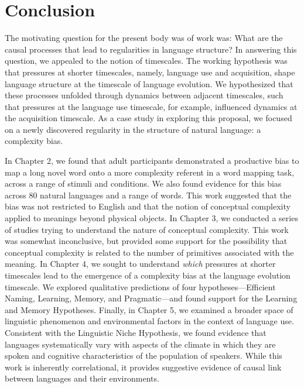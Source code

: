 
\chapter{Conclusion}
\label{chapter:conclusion}
The motivating question for the present body was of work was: What are the causal processes that lead to regularities in language structure?   In answering this question, we appealed to the notion of timescales. The working hypothesis was that pressures at shorter timescales, namely, language use and acquisition, shape language structure at the timescale of language evolution. We hypothesized that these processes unfolded through dynamics between adjacent timescales, such that pressures at the language use timescale, for example, influenced dynamics at the acquisition timescale.  As a case study in exploring this proposal, we focused on a newly discovered regularity in the structure of natural language: a complexity bias.

In Chapter 2, we found that adult participants demonstrated a productive bias to map a long novel word onto a more complexity referent in a word mapping task, across a range of stimuli and conditions. We  also found evidence for this bias across 80 natural languages and a range of words. This work suggested that  the bias was not restricted to English and that the notion of conceptual complexity applied to meanings beyond physical objects. In Chapter 3, we conducted a series of studies trying to understand the nature of conceptual complexity. This work was somewhat inconclusive, but provided some support for the possibility that conceptual complexity is related to the number of primitives associated with the meaning. In Chapter 4, we sought to understand {\it which} pressures at shorter timescales lead to the emergence of a complexity bias at the language evolution timescale. We explored qualitative predictions of four hypotheses---Efficient Naming, Learning, Memory, and Pragmatic---and found support for the Learning and Memory Hypotheses. Finally, in Chapter 5, we examined a broader space of linguistic phenomenon and environmental factors in the context of language use. Consistent with the Linguistic Niche Hypothesis, we found evidence that languages systematically vary with aspects of the climate in which they are spoken and cognitive characteristics of the population of speakers. While this work is inherently correlational, it provides suggestive evidence of causal link between languages and their environments.

